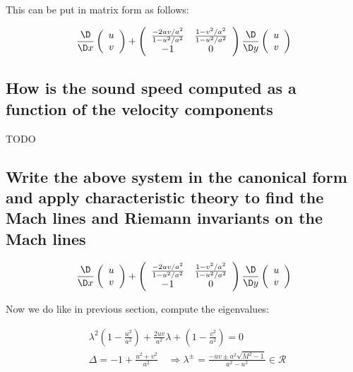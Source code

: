 \documentclass[british,french,11pt, a4paper, openany]{article}
\begin{document}
	This can be put in matrix form as follows: 

\begin{equation}
\frac{\D}{\D x} 
\left( 
\begin{array}{c}
u\\
v
\end{array}
\right)
+ 
\left( 
\begin{array}{ccc}
\frac{-2uv/a^2}{1-u^2/a^2} & \frac{1-v^2/a^2}{1-u^2/a^2}\\
-1 & 0
\end{array}
\right)
\frac{\D}{\D y} 
\left( 
\begin{array}{c}
u\\
v
\end{array}
\right)
\end{equation}

\subsection{How is the sound speed computed as a function of the velocity components}

TODO

\subsection{Write the above system in the canonical form and apply characteristic theory to find the Mach lines and Riemann invariants on the Mach lines}

\begin{equation}
\frac{\D}{\D x} 
\left( 
\begin{array}{c}
u\\
v
\end{array}
\right)
+ 
\left( 
\begin{array}{ccc}
\frac{-2uv/a^2}{1-u^2/a^2} & \frac{1-v^2/a^2}{1-u^2/a^2}\\
-1 & 0
\end{array}
\right)
\frac{\D}{\D y} 
\left( 
\begin{array}{c}
u\\
v
\end{array}
\right)
\end{equation}

Now we do like in previous section, compute the eigenvalues:

\begin{equation}
\begin{aligned}
&\lambda ^2 \left( 1-\frac{u^2}{a^2} \right) + \frac{2 uv}{a^2}\lambda + \left(1-\frac{v^2}{a^2} \right) = 0\\
&\Delta = - 1 + \frac{u^2 + v^2}{a^2} \quad \Rightarrow \lambda ^\pm = \frac{-uv\pm a^2 \sqrt{M^2 - 1}}{a^2 - u^2} \in \mathcal{R}
\end{aligned}
\end{equation}	 
\end{document}
